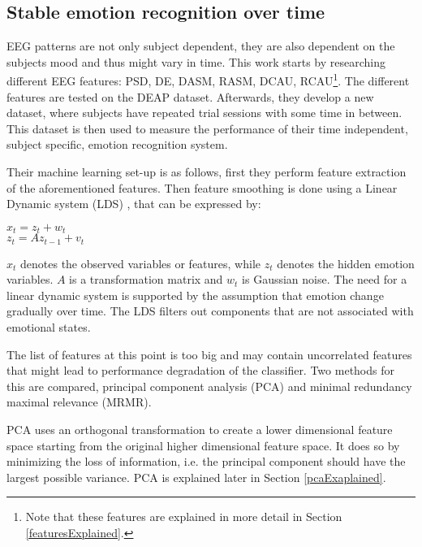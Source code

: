 \subsection{Stable emotion recognition over time}

EEG patterns are not only subject dependent, they are also dependent on the subjects mood and thus might vary in time\citep{killyPaper}. This work starts by researching different EEG features: PSD, DE, DASM, RASM, DCAU, RCAU\footnote{Note that these features are explained in more detail in Section \ref{featuresExplained}.}. The different features are tested on the DEAP dataset. Afterwards, they develop a new dataset, where subjects have repeated trial sessions with some time in between. This dataset is then used to measure the performance of their time independent, subject specific, emotion recognition system.

\npar

Their machine learning set-up is as follows, first they perform feature extraction of the aforementioned features. Then feature smoothing is done using a Linear Dynamic system (LDS) , that can be expressed by:
\begin{center}
$x_t = z_t + w_t$\\
$z_t = Az_{t-1} + v_t$
\end{center}
$x_t$ denotes the observed variables or features, while $z_t$ denotes the hidden emotion variables. $A$ is a transformation matrix and $w_t$ is Gaussian noise. The need for a linear dynamic system is supported by the assumption that emotion change gradually over time. The LDS filters out components that are not associated with emotional states.

\npar

The list of features at this point is too big and may contain uncorrelated features that might lead to performance degradation of the classifier. Two methods for this are compared, principal component analysis (PCA) and minimal redundancy maximal relevance (MRMR). 

\npar

PCA uses an orthogonal transformation to create a lower dimensional feature space starting from the original higher dimensional feature space. It does so by minimizing the loss of information, i.e. the principal component should have the largest possible variance. 
PCA is explained later in Section \ref{pcaExaplained}.

